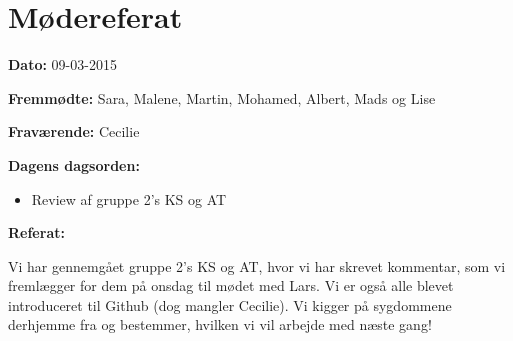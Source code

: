 \chapter{Mødereferat}

\textbf{Dato:} 09-03-2015

\textbf{Fremmødte:} Sara, Malene, Martin, Mohamed, Albert, Mads og Lise 

\textbf{Fraværende:} Cecilie

\textbf{Dagens dagsorden:}
\begin{itemize}
	\item Review af gruppe 2's KS og AT
\end{itemize}

\textbf{Referat:}

Vi har gennemgået gruppe 2's KS og AT, hvor vi har skrevet kommentar, som vi fremlægger for dem på onsdag til mødet med Lars. 
Vi er også alle blevet introduceret til Github (dog mangler Cecilie). 
Vi kigger på sygdommene derhjemme fra og bestemmer, hvilken vi vil arbejde med næste gang! 